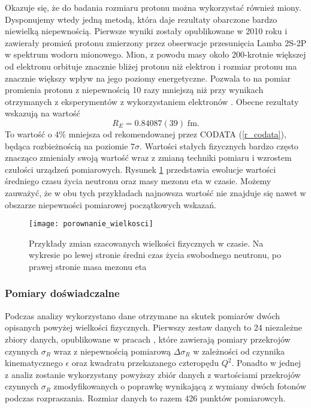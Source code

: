 \documentclass[11pt]{book}
\theoremstyle{definition}
\begin{document}
Okazuje się, że do badania rozmiaru protonu można wykorzystać również miony. Dysponujemy wtedy jedną metodą, która daje rezultaty obarczone bardzo niewielką niepewnością. Pierwsze wyniki zostały opublikowane w 2010 roku \cite{2010Nature..Pohl} i zawierały promień protonu zmierzony przez obserwacje przesunięcia Lamba 2S-2P w spektrum wodoru mionowego. Mion, z powodu masy około 200-krotnie większej od elektronu orbituje znacznie bliżej protonu niż elektron i rozmiar protonu ma znacznie większy wpływ na jego poziomy energetyczne. Pozwala to na pomiar promienia protonu z niepewnością 10 razy mniejszą niż przy wynikach otrzymanych z eksperymentów z wykorzystaniem elektronów \cite{Carlson:2015jba}.  Obecne rezultaty wskazują na wartość \cite{Antognini417}
%
\begin{equation}
R_E = 0.84087(39) \; \text{fm}.
\end{equation}
%
To wartość o 4\% mniejsza od rekomendowanej przez CODATA (\ref{r_codata}), będąca rozbieżnością na poziomie $7\sigma$. Wartości stałych fizycznych bardzo często znacząco zmieniały swoją wartość wraz z zmianą techniki pomiaru i wzrostem czułości urządzeń pomiarowych. Rysunek \ref{fig:porownaniewielkosci} przedstawia ewolucje wartości średniego czasu życia neutronu oraz masy mezonu eta w czasie. Możemy zauważyć, że w obu tych przykładach najnowsza wartość nie znajduje się nawet w obszarze niepewności pomiarowej początkowych wskazań.


\begin{figure}[h!]
	\centering
		\texttt{[image: porownanie\_wielkosci]}
	\caption{Przykłady zmian szacowanych wielkości fizycznych w czasie. Na wykresie po lewej stronie średni czas życia swobodnego neutronu, po prawej stronie masa mezonu eta \cite{PhysRevD.86.010001}}
	\label{fig:porownaniewielkosci}
\end{figure}



\subsubsection{Pomiary doświadczalne}
Podczas analizy wykorzystano dane otrzymane na skutek pomiarów dwóch opisanych powyżej wielkości fizycznych. Pierwszy zestaw danych to 24 niezależne zbiory danych, opublikowane w pracach \cite{1966PhRv..142..922J, 1966PhRvL..17..608B, 1967PhRvL..18.1014A, 1970PhLB...31...40L, 1970PhRvD...1.2449G, 1971PhLB...35...87B, 1971PhRvD...4...45P, 1974NuPhA.222..269B, 1973NuPhB..58..429B, 1973PhRvD...8...63K, 1993PhRvD..48...29S, 1994PhRvD..49.5671W, 1994PhRvD..50.5491A, 1975NuPhB..93..461B, 1975PhRvD..12.1884S, 1974PhRvC..10.2111M, 1980NuPhA.333..381S, 1981NuPhA.364..285S, 1992PhRvD..46...24R, 2003PhRvC..68f4603D, 2004PhRvC..70a5206C}, które zawierają pomiary przekrojów czynnych $\sigma_R$ wraz z niepewnością pomiarową $\Delta \sigma_R$ w zależności od czynnika kinematycznego $\epsilon$ oraz kwadratu przekazanego czteropędu $Q^2$. Ponadto w jednej z analiz zostanie wykorzystany powyższy zbiór danych z wartościami przekrojów czynnych $\sigma_R$ zmodyfikowanych o poprawkę wynikającą z wymiany dwóch fotonów podczas rozpraszania.  Rozmiar danych to razem 426 punktów pomiarowcyh. 
\end{document}
